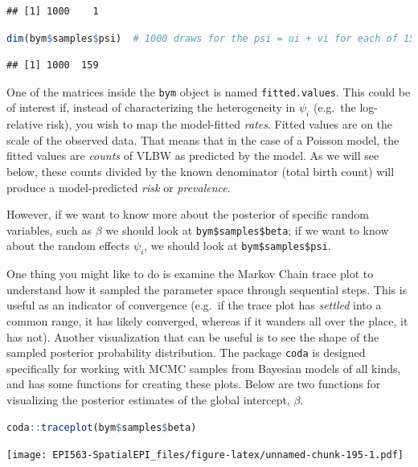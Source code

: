 \documentclass[
]{book}
\newcommand{\passthrough}[1]{#1}
\begin{document}
\begin{lstlisting}
## [1] 1000    1
\end{lstlisting}

\begin{lstlisting}[language=R]
dim(bym$samples$psi)  # 1000 draws for the psi = ui + vi for each of 159 counties
\end{lstlisting}

\begin{lstlisting}
## [1] 1000  159
\end{lstlisting}

One of the matrices inside the \passthrough{\lstinline!bym!} object is named \passthrough{\lstinline!fitted.values!}. This could be of interest if, instead of characterizing the heterogeneity in \(\psi_i\) (e.g.~the log-relative risk), you wish to map the model-fitted \emph{rates}. Fitted values are on the scale of the observed data. That means that in the case of a Poisson model, the fitted values are \emph{counts} of VLBW as predicted by the model. As we will see below, these counts divided by the known denominator (total birth count) will produce a model-predicted \emph{risk} or \emph{prevalence}.

However, if we want to know more about the posterior of specific random variables, such as \(\beta\) we should look at \passthrough{\lstinline!bym$samples$beta!}; if we want to know about the random effects \(\psi_i\), we should look at \passthrough{\lstinline!bym$samples$psi!}.

One thing you might like to do is examine the Markov Chain trace plot to understand how it sampled the parameter space through sequential steps. This is useful as an indicator of convergence (e.g.~if the trace plot has \emph{settled} into a common range, it has likely converged, whereas if it wanders all over the place, it has not). Another visualization that can be useful is to see the shape of the sampled posterior probability distribution. The package \passthrough{\lstinline!coda!} is designed specifically for working with MCMC samples from Bayesian models of all kinds, and has some functions for creating these plots. Below are two functions for visualizing the posterior estimates of the global intercept, \(\beta\).

\begin{lstlisting}[language=R]
coda::traceplot(bym$samples$beta)
\end{lstlisting}

\texttt{[image: EPI563-SpatialEPI\_files/figure-latex/unnamed-chunk-195-1.pdf]}
\end{document}
